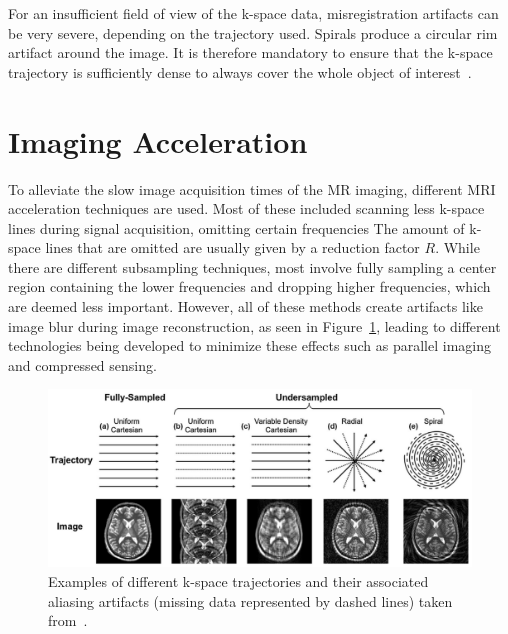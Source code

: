 \documentclass[english,version-2022-01]{uzl-thesis} %
\begin{document}
For an insufficient field of view of the k-space data, misregistration artifacts can be very severe, depending on the trajectory used. Spirals produce a circular rim artifact around the image. It is therefore mandatory to ensure that the k-space trajectory is sufficiently dense to always cover the whole object of interest~\cite{SamplingStrategies}. 

\section{Imaging Acceleration} \label{Sec:ImagingAcceleration}
To alleviate the slow image acquisition times of the MR imaging, different MRI acceleration techniques are used. Most of these included scanning less k-space lines during signal acquisition, omitting certain frequencies
The amount of k-space lines that are omitted are usually given by a reduction factor $R$. While there are different subsampling techniques, most involve fully sampling a center region containing the lower frequencies and dropping higher frequencies, which are deemed less important. However, all of these methods create artifacts like image blur during image reconstruction, as seen in Figure~\ref{fig:ExamplesSubsampling}, leading to different technologies being developed to minimize these effects such as parallel imaging and compressed sensing.

\begin{figure}[htpb]
	\centering
	\graphicspath{{images/}{\main/images/}}
	\includegraphics[width=\linewidth]{ExamplesSubsampling.png} 
	\caption{Examples of different k-space trajectories and their associated aliasing artifacts (missing data represented by dashed lines) taken from~\cite{AdvancesPI}.}
	\label{fig:ExamplesSubsampling}
\end{figure}
\end{document}
